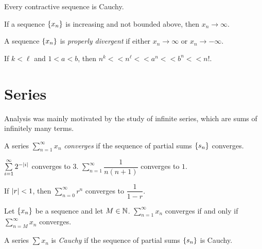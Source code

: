 \documentclass{article}
\begin{document}
\begin{theorem}
  Every contractive sequence is Cauchy.
\end{theorem}

\begin{theorem}
  If a sequence $\{x_n\}$ is increasing and not bounded above, then $x_n \to \infty$.
\end{theorem}

\begin{definition}
  A sequence $\{x_n\}$ is \emph{properly divergent} if either $x_n \to \infty$ or $x_n \to -\infty$.
\end{definition}

\begin{theorem}
  If $k < \ell$ and $1 < a < b$, then $n^k << n^\ell << a^n << b^n << n!$.
\end{theorem}

\section{Series}

Analysis was mainly motivated by the study of infinite series, which are sums of infinitely many terms.

\begin{definition}
  A series $\sum_{n=1}^\infty x_n$ \emph{converges} if the sequence of partial sums $\{s_n\}$ converges.
\end{definition}

\begin{example}
  $\sum\limits_{i = 1}^\infty 2^{-\abs{i}}$ converges to $3$.
  $\sum\limits_{n = 1}^\infty \dfrac{1}{n(n + 1)}$ converges to $1$.
\end{example}

\begin{theorem}
  If $\abs{r} < 1$, then $\sum\limits_{n = 0}^\infty r^n$ converges to $\dfrac{1}{1 - r}$.
\end{theorem}

\begin{theorem}
  Let $\{x_n\}$ be a sequence and let $M \in \mathbb{N}$.
  $\sum\limits_{n = 1}^\infty x_n$ converges if and only if $\sum\limits_{n = M}^\infty x_n$ converges.
\end{theorem}

\begin{definition}
  A series $\sum x_n$ is \emph{Cauchy} if the sequence of partial sums $\{s_n\}$ is Cauchy.
\end{definition}
\end{document}

